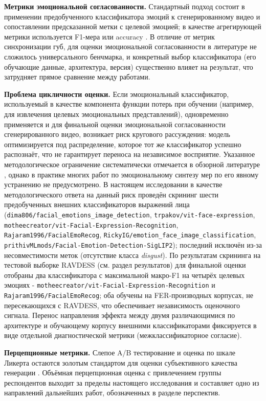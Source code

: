 \documentclass[a4paper, 12pt, oneside, openany]{article}
\begin{document}
\textbf{Метрики эмоциональной согласованности.} Стандартный подход состоит в применении предобученного классификатора эмоций к сгенерированному видео и сопоставлении предсказанной метки с целевой эмоцией; в качестве агрегирующей метрики используется F1-мера или accuracy \cite{ji2022eamm,wang2023eat}. В отличие от метрик синхронизации губ, для оценки эмоциональной согласованности в литературе не сложилось универсального бенчмарка, и конкретный выбор классификатора (его обучающие данные, архитектура, версия) существенно влияет на результат, что затрудняет прямое сравнение между работами.

\textbf{Проблема цикличности оценки.} Если эмоциональный классификатор, используемый в качестве компонента функции потерь при обучении (например, для извлечения целевых эмоциональных представлений), одновременно применяется и для финальной оценки эмоциональной согласованности сгенерированного видео, возникает риск кругового рассуждения: модель оптимизируется под распределение, которое тот же классификатор успешно распознаёт, что не гарантирует переноса на независимое восприятие. Указанное методологическое ограничение систематически отмечается в обзорной литературе \cite{jiang2024survey}, однако в практике многих работ по эмоциональному синтезу мер по его явному устранению не предусмотрено. В настоящем исследовании в качестве методологического ответа на данный риск проведён скрининг шести предобученных внешних классификаторов выражений лица (\texttt{dima806/facial\_emotions\_image\_detection}, \texttt{trpakov/vit-face-expression}, \texttt{motheecreator/vit-Facial-Expression-Recognition}, \texttt{Rajaram1996/FacialEmoRecog}, \texttt{RickyIG/emotion\_face\_image\_classification}, \texttt{prithivMLmods/Facial-Emotion-Detection-SigLIP2}); последний исключён из-за несовместимости меток (отсутствие класса \textit{disgust}). По результатам скрининга на тестовой выборке RAVDESS (см. раздел результатов) для финальной оценки отобраны два классификатора с максимальной макро-F1 на четырёх целевых эмоциях - \texttt{motheecreator/vit-Facial-Expression-Recognition} и \texttt{Rajaram1996/FacialEmoRecog}; оба обучены на FER-производных корпусах, не пересекающихся с RAVDESS, что обеспечивает независимость оценочного сигнала. Перенос направления эффекта между двумя различающимися по архитектуре и обучающему корпусу внешними классификаторами фиксируется в виде отдельной диагностической метрики (межклассификаторное согласие).

\textbf{Перцепционные метрики.} Слепое A/B тестирование и оценка по шкале Ликерта \cite{likert1932} остаются золотым стандартом для оценки субъективного качества генерации \cite{zhou2025}. Объёмная перцепционная оценка с привлечением группы респондентов выходит за пределы настоящего исследования и составляет одно из направлений дальнейших работ, обозначенных в разделе перспектив.
\end{document}
